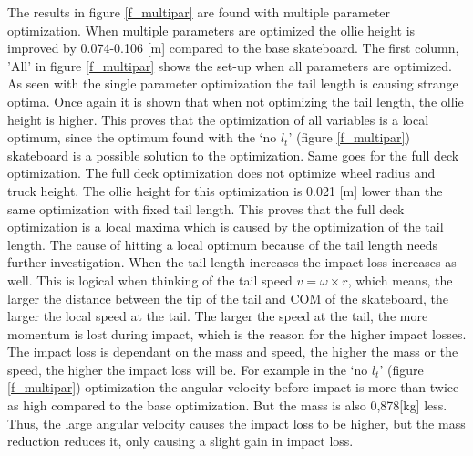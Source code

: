 \documentclass[default,iicol]{sn-jnl}
\begin{document}
{\noindent The results in figure \ref{f_multipar} are found with multiple parameter optimization. When multiple parameters are optimized the ollie height is improved by 0.074-0.106 [m] compared to the base skateboard. The first column, 'All' in figure \ref{f_multipar} shows the set-up when all parameters are optimized. As seen with the single parameter optimization the tail length is causing strange optima. Once again it is shown that when not optimizing the tail length, the ollie height is higher. This proves that the optimization of all variables is a local optimum, since the optimum found with the `no $l_t$' (figure \ref{f_multipar}) skateboard is a possible solution to the optimization. Same goes for the full deck optimization. The full deck optimization does not optimize wheel radius and truck height. The ollie height for this optimization is 0.021 [m] lower than the same optimization with fixed tail length. This proves that the full deck optimization is a local maxima which is caused by the optimization of the tail length. The cause of hitting a local optimum because of the tail length needs further investigation. When the tail length increases the impact loss increases as well. This is logical when thinking of the tail speed $v = \omega \times r$, which means, the larger the distance between the tip of the tail and COM of the skateboard, the larger the local speed at the tail. The larger the speed at the tail, the more momentum is lost during impact, which is the reason for the higher impact losses. The impact loss is dependant on the mass and speed, the higher the mass or the speed, the higher the impact loss will be. For example in the `no $l_t$' (figure \ref{f_multipar}) optimization the angular velocity before impact is more than twice as high compared to the base optimization. But the mass is also 0,878[kg] less. Thus, the large angular velocity causes the impact loss to be higher, but the mass reduction reduces it, only causing a slight gain in impact loss. 

}
\end{document}
